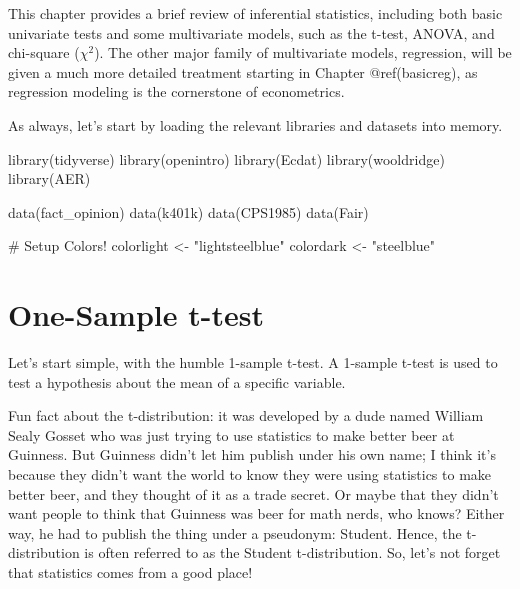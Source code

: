\documentclass[
  letterpaper,
]{book}
\newenvironment{Shaded}{\begin{snugshade}}{\end{snugshade}}
\newcommand{\CommentTok}[1]{\textcolor[rgb]{0.37,0.37,0.37}{#1}}
\newcommand{\FunctionTok}[1]{\textcolor[rgb]{0.28,0.35,0.67}{#1}}
\newcommand{\NormalTok}[1]{\textcolor[rgb]{0.00,0.23,0.31}{#1}}
\newcommand{\OtherTok}[1]{\textcolor[rgb]{0.00,0.23,0.31}{#1}}
\newcommand{\StringTok}[1]{\textcolor[rgb]{0.13,0.47,0.30}{#1}}
\begin{document}
This chapter provides a brief review of inferential statistics,
including both basic univariate tests and some multivariate models, such
as the t-test, ANOVA, and chi-square (\(\chi^2\)). The other major
family of multivariate models, regression, will be given a much more
detailed treatment starting in Chapter @ref(basicreg), as regression
modeling is the cornerstone of econometrics.

As always, let's start by loading the relevant libraries and datasets
into memory.

\begin{Shaded}
\begin{Highlighting}[]
\FunctionTok{library}\NormalTok{(tidyverse)}
\FunctionTok{library}\NormalTok{(openintro)}
\FunctionTok{library}\NormalTok{(Ecdat)}
\FunctionTok{library}\NormalTok{(wooldridge)}
\FunctionTok{library}\NormalTok{(AER)}

\FunctionTok{data}\NormalTok{(fact\_opinion)}
\FunctionTok{data}\NormalTok{(k401k)}
\FunctionTok{data}\NormalTok{(CPS1985)}
\FunctionTok{data}\NormalTok{(Fair)}

\CommentTok{\# Setup Colors!}
\NormalTok{colorlight }\OtherTok{\textless{}{-}} \StringTok{"lightsteelblue"}
\NormalTok{colordark }\OtherTok{\textless{}{-}} \StringTok{"steelblue"}
\end{Highlighting}
\end{Shaded}

\section{One-Sample t-test}\label{one-sample-t-test}

Let's start simple, with the humble 1-sample t-test. A 1-sample t-test
is used to test a hypothesis about the mean of a specific variable.

Fun fact about the t-distribution: it was developed by a dude named
William Sealy Gosset who was just trying to use statistics to make
better beer at Guinness. But Guinness didn't let him publish under his
own name; I think it's because they didn't want the world to know they
were using statistics to make better beer, and they thought of it as a
trade secret. Or maybe that they didn't want people to think that
Guinness was beer for math nerds, who knows? Either way, he had to
publish the thing under a pseudonym: Student. Hence, the t-distribution
is often referred to as the Student t-distribution. So, let's not forget
that statistics comes from a good place!
\end{document}
